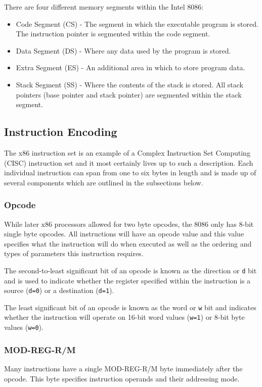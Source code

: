     There are four different memory segments within the Intel 8086:
    \begin{itemize}
        \item Code Segment (CS) - The segment in which the executable program is stored. The instruction pointer is segmented within the code segment.
        \item Data Segment (DS) - Where any data used by the program is stored.
        \item Extra Segment (ES) - An additional area in which to store program data.
        \item Stack Segment (SS) - Where the contents of the stack is stored. All stack pointers (base pointer and stack pointer) are segmented within the stack segment.
    \end{itemize}

\subsection{Instruction Encoding}
    The x86 instruction set is an example of a Complex Instruction Set Computing (CISC) instruction set and it most certainly lives up to such a description. Each individual instruction can span from one to six bytes in length and is made up of several components which are outlined in the subsections below.

    \subsubsection{Opcode}
        While later x86 processors allowed for two byte opcodes, the 8086 only has 8-bit single byte opcodes. All instructions will have an opcode value and this value specifies what the instruction will do when executed as well as the ordering and types of parameters this instruction requires.

        The second-to-least significant bit of an opcode is known as the direction or \texttt{d} bit and is used to indicate whether the register specified within the instruction is a source (\texttt{d=0}) or a destination (\texttt{d=1}).

        The least significant bit of an opcode is known as the word or \texttt{w} bit and indicates whether the instruction will operate on 16-bit word values (\texttt{w=1}) or 8-bit byte values (\texttt{w=0}).

    \subsubsection{MOD-REG-R/M}
        Many instructions have a single MOD-REG-R/M byte immediately after the opcode. This byte specifies instruction operands and their addressing mode.

